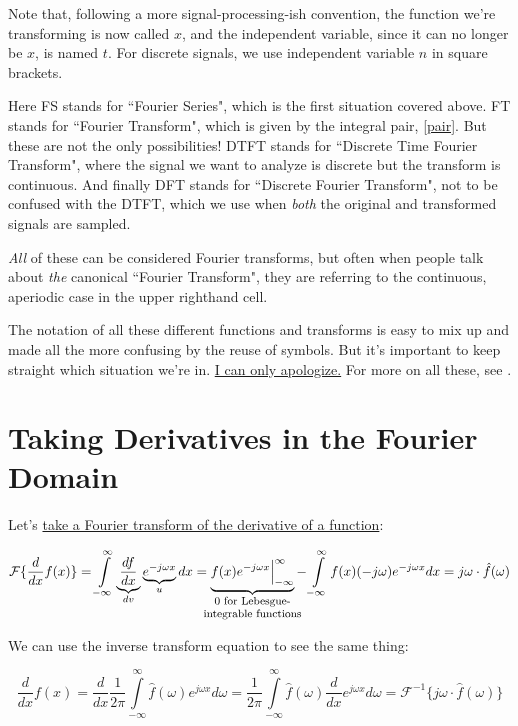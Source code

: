 \documentclass[10pt]{article}
\begin{document}
\noindent Note that, following a more signal-processing-ish convention\cite{oppenheim}, the function we're transforming is now called $x$, and the independent variable, since it can no longer be $x$, is named $t$. For discrete signals, we use independent variable $n$ in square brackets.

Here FS stands for ``Fourier Series", which is the first situation covered above. FT stands for ``Fourier Transform", which is given by the integral pair, \autoref{pair}. But these are not the only possibilities! DTFT stands for ``Discrete Time Fourier Transform", where the signal we want to analyze is discrete but the transform is continuous. And finally DFT stands for ``Discrete Fourier Transform", not to be confused with the DTFT, which we use when \textit{both} the original and transformed signals are sampled.

\textit{All} of these can be considered Fourier transforms, but often when people talk about \textit{the} canonical ``Fourier Transform", they are referring to the continuous, aperiodic case in the upper righthand cell.

The notation of all these different functions and transforms is easy to mix up and made all the more confusing by the reuse of symbols. But it's important to keep straight which situation we're in. \href{https://www.youtube.com/watch?v=6ITWKtTYlEI&t=69s}{I can only apologize.} For more on all these, see \cite{oppenheim}.

\section{Taking Derivatives in the Fourier Domain}\label{derivative}

Let's \href{https://www.youtube.com/watch?v=d5d0ORQHNYs}{take a Fourier transform of the derivative of a function}\cite{brunton}:

$$\mathcal{F}\{\frac{d}{dx} f(x)\} = \int\limits_{-\infty}^{\infty} \underbrace{\frac{df}{dx}}_{dv} \underbrace{e^{-j \omega x}}_{u} dx = \underbrace{f(x) e^{-j \omega x} \Big|_{-\infty}^{\infty}}_{\mathclap{\parbox{30mm}{\footnotesize \centering 0 for Lebesgue-\\integrable functions}}} - \int\limits_{-\infty}^{\infty} f(x) (-j \omega) e^{-j \omega x} dx = j \omega \cdot \hat{f}(\omega)$$

\noindent We can use the inverse transform equation to see the same thing:

$$\frac{d}{dx} f(x) = \frac{d}{dx} \frac{1}{2\pi} \int\limits_{-\infty}^{\infty} \hat{f}(\omega) e^{j \omega x} d \omega = \frac{1}{2\pi} \int\limits_{-\infty}^{\infty} \hat{f}(\omega) \frac{d}{dx} e^{j \omega x} d \omega = \mathcal{F}^{-1}\{j \omega \cdot \hat{f}(\omega)\}$$
\end{document}
